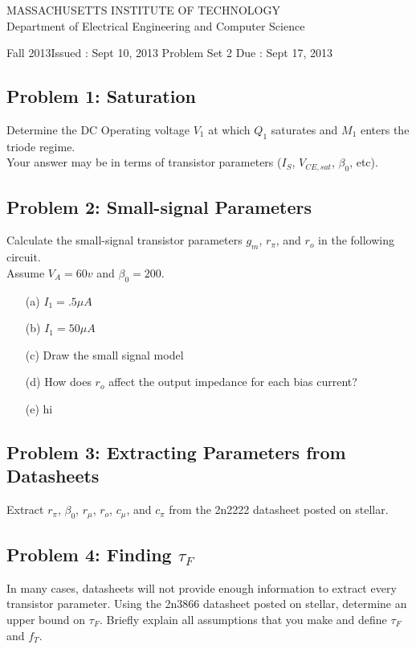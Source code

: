 \documentclass[11pt,twoside]{article}
\newlength{\toppush}
\newcommand{\htitle}[3]{\begin{center}
\vspace*{-\toppush}
{\large MASSACHUSETTS INSTITUTE OF TECHNOLOGY}\\
{\small Department of Electrical Engineering and Computer Science}\\
\vspace*{1ex}{\Large #2}\end{center}
\noindent
\newline\parbox{6.5in}
{Fall 2013\hfill Issued : #1 \newline
 Problem Set 2 \hfill Due : #3\newline
}}
\newcommand{\handout}[3]{\thispagestyle{empty}
\pagestyle{myheadings}\htitle{#1}{#2}{#3}}
\begin{document}
\handout{Sept 10, 2013}{6.301 Solid State Circuits}{Sept 17, 2013}
\setlength{\parindent}{0pt}

\newcommand{\solution}{
 \medskip
 {\bf Solution:}
}

\hrulefill

\flushleft
\subsection*{Problem 1: Saturation}
Determine the DC Operating voltage $V_1$ at which $Q_1$ saturates and $M_1$ enters the triode regime. \\
Your answer may be in terms of transistor parameters ($I_S$, $V_{CE,sat}$, $\beta_0$, etc).

\begin{center}
\end{center}

\subsection*{Problem 2: Small-signal Parameters}
Calculate the small-signal transistor parameters $g_m$, $r_{\pi}$, and $r_o$ in the following circuit. \\
Assume $V_A = 60v$ and $\beta_0 = 200$.  \\

\begin{enumerate}
\item[(a)] $I_1 = .5\mu A$
\item[(b)] $I_1 = 50\mu A$
\item[(c)] Draw the small signal model
\item[(d)] How does $r_o$  affect the output impedance for each bias current?
\item[(e)] hi 
\end{enumerate}

\subsection*{Problem 3: Extracting Parameters from Datasheets}
Extract $r_\pi$, $\beta_0$, $r_\mu$, $r_o$, $c_\mu$, and $c_\pi$ from the 2n2222 datasheet posted on stellar.

\subsection*{Problem 4: Finding $\tau_F$} 
In many cases, datasheets will not provide enough information to extract every transistor parameter.  
Using the 2n3866 datasheet posted on stellar, determine an upper bound on $\tau_F$.  Briefly explain all assumptions that you make and define $\tau_F$ and $f_T$.


\clearpage
\end{document}
